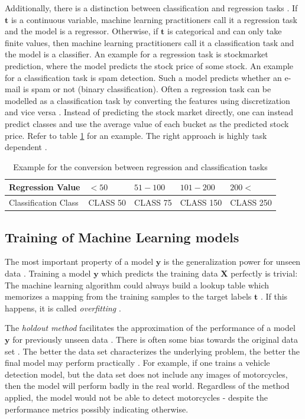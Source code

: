 \documentclass[draft,final,oneside]{vutinfth} %
\begin{document}
Additionally, there is a distinction between classification and regression tasks \cite{bishop}. If $\boldsymbol{t}$ is a continuous variable, machine learning practitioners call it a regression task and the model is a regressor. Otherwise, if $\boldsymbol{t}$ is categorical and can only take finite  values, then machine learning practitioners call it a classification task and the model is a classifier. An example for a regression task is stockmarket prediction, where the model predicts the stock price of some stock. An example for a classification task is spam detection. Such a model predicts whether an e-mail is spam or not (binary classification). Often a regression task can be modelled as a classification task by converting the features using discretization and vice versa \cite{discretization}. Instead of predicting the stock market directly, one can instead predict classes and use the average value of each bucket as the predicted stock price. Refer to table \ref{table:conversionregressclass} for an example. The right approach is highly task dependent \cite{aimodern}.

\begin{table}[]
\centering
\begin{tabular}{|l||l|l|l|l|}
\hline
Regression Value & $<50$ & $51 - 100$ & $101 - 200$ & $200<$ \\
\hline
Classification Class & CLASS 50      & CLASS 75 & CLASS 150 & CLASS 250 \\
\hline
\end{tabular}
\caption{Example for the conversion between regression and classification tasks }
\label{table:conversionregressclass}
\end{table}

\subsection{Training of Machine Learning models} \label{trainingofml}

The most important property of a model $\boldsymbol{y}$ is the generalization power for unseen data \cite{bishop}. Training a model $\boldsymbol{y}$ which predicts the training data $\boldsymbol{X}$ perfectly is trivial: The machine learning algorithm could always build a lookup table which memorizes a mapping from the training samples to the target labels $\boldsymbol{t}$ \cite{overfitting}. If this happens, it is called \textit{overfitting} \cite{overfitting}.

The \textit{holdout method} facilitates the approximation of the performance of a model $\boldsymbol{y}$ for previously unseen data \cite{holdoutcrossvalidation}. There is often some bias towards the original data set \cite{datasetbias}. The better the data set characterizes the underlying problem, the better the final model may perform practically \cite{datasetshift}. For example, if one trains a vehicle detection model, but the data set does not include any images of motorcycles, then the model will perform badly in the real world. Regardless of the method applied, the model would not be able to detect motorcycles - despite the performance metrics possibly indicating otherwise.
\end{document}

